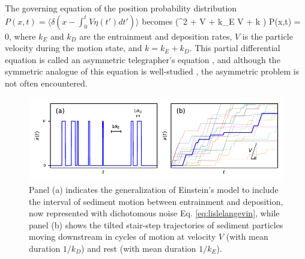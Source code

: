 The governing equation of the position probability distribution $P(x,t) = \langle \delta(x-\int_0^t V\eta(t')dt') \rangle$ becomes \citep[cf.][]{Balakrishnan1993}
\be \big(\pt^2 + V \px \pt + k_E V \px + k \pt \big) P(x,t) = 0,\label{eq:lislemaster}\ee
where $k_E$ and $k_D$ are the entrainment and deposition rates, $V$ is the particle velocity during the motion state, and $k = k_E+k_D$. This partial differential equation is called an asymmetric telegrapher's equation \citep{Rossetto2018}, and although the symmetric analogue of this equation is well-studied \citep{Weiss2002a, Masoliver2017}, the asymmetric problem is not often encountered.
\begin{figure}[!htbp]
	\includegraphics[width=\linewidth,keepaspectratio]{./figures/ch1/lisleConcept.pdf}
	\caption{Panel (a) indicates the generalization of Einstein's model to include the interval of sediment motion between entrainment and deposition, now represented with dichotomous noise Eq. \ref{eq:lislelangevin}, while panel (b) shows the tilted stair-step trajectories of sediment particles moving downstream in cycles of motion at velocity $V$ (with mean duration $1/k_D$) and rest (with mean duration $1/k_E$). }
	\label{fig:lislefig}
\end{figure}

